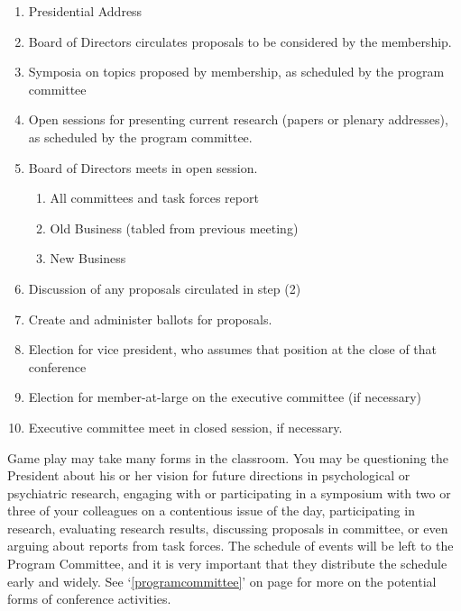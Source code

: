 \begin{refsection}
\begin{enumerate}
\item Presidential Address \newline
\item  Board of Directors circulates proposals to be considered by the membership. \newline
\item Symposia on topics proposed by membership, as scheduled by the program committee \newline
\item  Open sessions for presenting current research (papers or plenary addresses), as scheduled by the program committee. \newline
\item  Board of Directors meets in open session. \newline
\begin{enumerate}
    \item  All committees and task forces report \newline
    \item  Old Business (tabled from previous meeting) \newline
    \item  New Business \newline
\end{enumerate}
\item  Discussion of any proposals circulated in step (2) \newline
\item  Create and administer ballots for proposals. \newline
\item  Election for vice president, who assumes that position at the close of that conference \newline
\item  Election for member-at-large on the executive committee (if necessary) \newline
\item  Executive committee meet in closed session, if necessary. \newline
\end{enumerate}



 

Game play may take many forms in the classroom. You may be questioning the President about his or her vision for future directions in psychological or psychiatric research, engaging with or participating in a symposium with two or three of your colleagues on a contentious issue of the day, participating in research, evaluating research results, discussing proposals in committee, or even arguing about reports from task forces. The schedule of events will be left to the Program Committee, and it is very important that they distribute the schedule early and widely. See `\ref{programcommittee}' on page \pageref{programcommittee} for more on the potential forms of conference activities.


\end{refsection}
